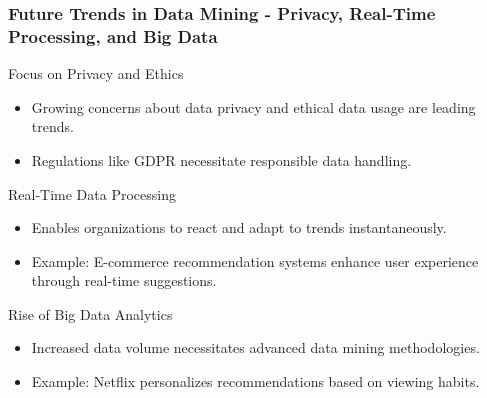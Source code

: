 \documentclass[aspectratio=169]{beamer}
\begin{document}
\begin{frame}[fragile]
    \frametitle{Future Trends in Data Mining - Privacy, Real-Time Processing, and Big Data}
    \begin{block}{Focus on Privacy and Ethics}
        \begin{itemize}
            \item Growing concerns about data privacy and ethical data usage are leading trends.
            \item Regulations like GDPR necessitate responsible data handling.
        \end{itemize}
    \end{block}

    \begin{block}{Real-Time Data Processing}
        \begin{itemize}
            \item Enables organizations to react and adapt to trends instantaneously.
            \item Example: E-commerce recommendation systems enhance user experience through real-time suggestions.
        \end{itemize}
    \end{block}

    \begin{block}{Rise of Big Data Analytics}
        \begin{itemize}
            \item Increased data volume necessitates advanced data mining methodologies.
            \item Example: Netflix personalizes recommendations based on viewing habits.
        \end{itemize}
    \end{block}
\end{frame}
\end{document}
